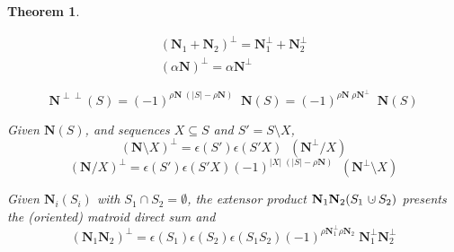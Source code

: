 \documentclass[12pt]{article}
\newtheorem{theorem}{Theorem}[section]
\theoremstyle{definition}
\newcommand{\dunion}
{\mbox{\hbox{\hskip6pt$\cdot$\hskip-5.50pt$\cup$\hskip2pt}}}
\newcommand{\Card}[1]{\ensuremath{{\left|#1\right|}}}
\newcommand{\ext}[1]{\ensuremath{\mathbf{#1}}}
\begin{document}
\begin{theorem}
\label{Identities}
\item
\begin{equation}
\label{LinearityPerp}
\begin{split}
(\ext{N}_1+\ext{N}_2)^\perp = \ext{N}_1^\perp + \ext{N}_2^\perp\\
(\alpha\ext{N})^\perp = \alpha\ext{N}^\perp
\end{split}
\end{equation}

\item
\begin{equation}
\label{PerpPerp}
\ext{N}^{\perp\perp}(S) = (-1)^{\rho\ext{N}\;(\Card{S}-\rho\ext{N})}\;\;\ext{N}(S)
                        = (-1)^{\rho\ext{N}\;\rho\ext{N}^\perp}\;\;\ext{N}(S)
\end{equation}

\item
Given $\ext{N}(S)$, and sequences $X\subseteq S$ and $S'=S\setminus X$,
\begin{equation}
\label{DeletePerp}
(\ext{N}\setminus X)^\perp = \epsilon(S')\epsilon(S'X)\;\;(\ext{N}^\perp/X)
\end{equation}
\begin{equation}
\label{ContractPerp}
(\ext{N}/X )^\perp = \epsilon(S')\epsilon(S'X)
(-1)^{\Card{X}\;(\Card{S}-\rho\ext{N})}\;\;(\ext{N}^\perp\setminus X)
\end{equation}

\item 
Given $\ext{N}_i(S_i)$ with $S_1\cap S_2=\emptyset$, the extensor
product $\ext{N}_1\ext{N}_2(S_1\dunion S_2)$ presents the (oriented)
matroid direct sum and 
\begin{equation}
\label{ProdPerp}
(\ext{N}_1\ext{N}_2)^\perp 
= \epsilon(S_1)\epsilon(S_2)\epsilon(S_1S_2)
(-1)^{\rho\ext{N}_1^\perp\rho\ext{N}_2}\;\ext{N}_1^\perp\ext{N}_2^\perp
\end{equation}
\end{theorem}
\end{document}
